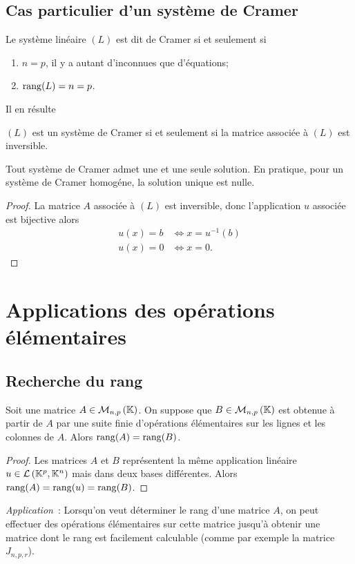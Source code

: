 \subsection{Cas particulier d'un  système de Cramer}
%
\begin{defdef}
  Le système linéaire \((L)\) est dit de Cramer si et seulement si
  \begin{enumerate}
  \item \(n=p\), il y a autant d'inconnues que d'équations;
  \item \(\operatorname{rang}(L)=n=p\).
  \end{enumerate}
\end{defdef}
Il en résulte
\begin{theo}
  \((L)\) est un système de Cramer si et seulement si la matrice associée à \((L)\) est inversible.
\end{theo}
%
\begin{theo}
  Tout système de Cramer admet une et une seule solution. En pratique, pour un système de Cramer homogéne, la solution unique est nulle.
\end{theo}
\begin{proof}
 La matrice \(A\) associée à \((L)\) est inversible, donc l'application \(u\) associée est bijective alors
 \begin{align}
   u(x)=b &\iff x=u^{-1}(b) \\
   u(x)=0 &\iff x=0.
 \end{align}
\end{proof}
%
\section{Applications des opérations élémentaires}
%

\subsection{Recherche du rang}
%
\begin{lemme}
  Soit une matrice \(A \in \mathcal{M}_{n,p}\left(\mathbb{K}\right)\). On suppose que \(B\in \mathcal{M}_{n,p}\left(\mathbb{K}\right)\) est obtenue à partir de \(A\) par une suite finie d'opérations élémentaires sur les lignes et les colonnes de \(A\). Alors \(\operatorname{rang}(A)=\operatorname{rang}(B)\).
\end{lemme}
\begin{proof}
Les matrices \(A\) et \(B\) représentent la même application linéaire \(u \in \mathcal{L}\left(\mathbb{K}^p,\mathbb{K}^n\right)\) mais dans deux bases différentes. Alors \(\operatorname{rang}(A)=\operatorname{rang}(u)=\operatorname{rang}(B)\).
\end{proof}
\emph{Application}~: Lorsqu'on veut déterminer le rang d'une matrice \(A\), on peut effectuer des opérations élémentaires sur cette matrice jusqu'à obtenir une matrice dont le rang est facilement calculable (comme par exemple la matrice \(J_{n,p,r}\)).
%
